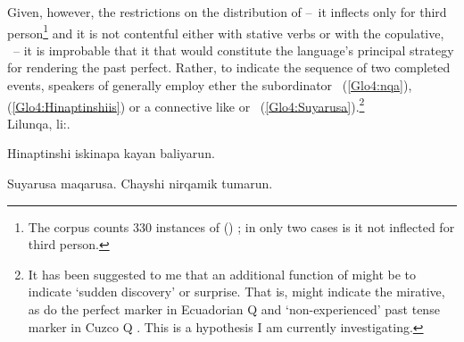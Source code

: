 \noindent
Given, however, the restrictions on the distribution of  --~it inflects only for third person\footnote{The corpus counts 330 instances of  () ; in only two cases is it not inflected for third person.} and it is not contentful either with stative verbs or with the copulative, ~-- it is improbable that it that would constitute the language’s principal strategy for rendering the past perfect. Rather, to indicate the sequence of two completed events, speakers of \SYQ{} generally employ ether the subordinator ~(\ref{Glo4:nqa}), (\ref{Glo4:Hinaptinshiis}) or a connective like  or ~(\ref{Glo4:Suyarusa}).\footnote{It has been suggested to me that an additional function of  might be to indicate ‘sudden discovery’ \citep{Adelaar77} or surprise. That is,  might indicate the mirative, as do the perfect marker  in Ecuadorian Q \citep{muysken1977syntactic} and ‘non-experienced’ past tense marker  in Cuzco Q \citep{Faller03} \citep[as cited in][223--33]{Peterson14}. This is a hypothesis I am currently investigating.}\\

%
{Lilunqa, li:.}%
{}%
{}{}%

%
{Hinaptinshi iskinapa kayan baliyarun.}%
{}%
{}{}%

%
{Suyarusa  maqarusa. Chayshi nirqamik tumarun.}%
{}%
{}{}%

